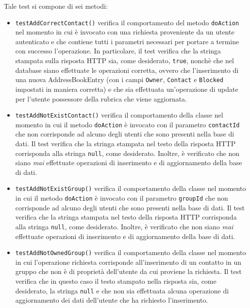 \begin{itemize}
Tale test si compone di sei metodi: 
\begin{itemize}

\item \texttt{testAddCorrectContact()} verifica il comportamento del metodo \texttt{doAction} nel momento in cui è invocato con una richiesta proveniente da un utente autenticato e che contiene tutti i parametri necessari per portare a termine con successo l'operazione. In particolare, il test verifica che la stringa stampata sulla risposta HTTP sia, come desiderato, \texttt{true}, nonchè che nel database siano effettuate le operazioni corretta, ovvero che l'inserimento di una nuova AddressBookEntry (con i campi \texttt{Owner}, \texttt{Contact} e \texttt{Blocked} impostati in maniera corretta) e che sia effettuata un'operazione di update per l'utente possessore della rubrica che viene aggiornata.

\item \texttt{testAddNotExistContact()} verifica il comportamento della classe nel momento in cui il metodo \texttt{doAction} è invocato con il parametro \texttt{contactId} che non corrisponde ad alcuno degli utenti che sono presenti nella base di dati. Il test verifica che la stringa stampata nel testo della risposta HTTP corrisponda alla stringa \texttt{null}, come desiderato. Inoltre, è verificato che non siano \textit{mai} effettuate operazioni di inserimento e di aggiornamento della base di dati.

\item \texttt{testAddNotExistGroup()} verifica il comportamento della classe nel momento in cui il metodo \texttt{doAction} è invocato con il parametro \texttt{groupId} che non corrisponde ad alcuno degli utenti che sono presenti nella base di dati. Il test verifica che la stringa stampata nel testo della risposta HTTP corrisponda alla stringa \texttt{null}, come desiderato. Inoltre, è verificato che non siano \textit{mai} effettuate operazioni di inserimento e di aggiornamento della base di dati.

\item \texttt{testAddNotOwnedGroup()} verifica il comportamento della classe nel momento in cui l'operazione richiesta corrisponde all'inserimento di un contatto in un gruppo che non è di proprietà dell'utente da cui proviene la richiesta. Il test verifica che in questo caso il testo stampato nella risposta sia, come desiderato, la stringa \texttt{null} e che non sia effettuata alcuna operazione di aggiornamento dei dati dell'utente che ha richiesto l'inserimento.


\end{itemize}
\end{itemize}
